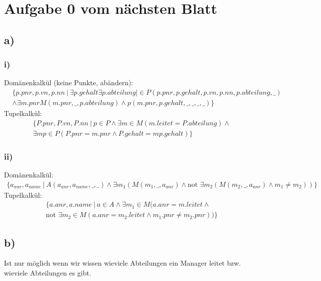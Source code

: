 \section*{Aufgabe 0 vom nächsten Blatt}
\subsection*{a)}
\subsubsection*{i)}
Domänenkalkül (keine Punkte, abändern):
\begin{align*}
&\{p.pnr,p.vn,p.nn\ |\ \exists p.gehalt \exists p.abteilung | \in P(p.pnr,p.gehalt,p.vn,p.nn,p.abteilung,\_)\\
&\land \exists m.pnr M(m.pnr,\_,p.abteilung)\land p(m.pnr,p.gehalt,\_,\_,\_,\_)\}
\end{align*}
Tupelkalkül:
\begin{align*}
  &\{P.pnr,P.vn,P.nn\ |\ p\in P\land \exists m\in M(m.leitet = P.abteilung)\land\\ 
  &\exists mp\in P(P.pnr = m.pnr \land P.gehalt = mp.gehalt)\}
\end{align*}
\subsubsection*{ii)}
Domänenkalkül:
\begin{align*}
  \{a_{anr},a_{name}\ |\ A(a_{anr},a_{name},\_,\_)\land \exists m_1 (M(m_1,\_,a_{anr})\land \text{not }\exists m_2(M(m_2,\_,a_{anr})\land m_1 \not = m_2))  \}
\end{align*}
Tupelkalkül:
\begin{align*}
&\{a.anr,a.name\ |\ a\in A \land \exists m_1 \in M(a.anr = m.leitet \land\\
&\text{not }\exists m_2 \in M(a.anr = m_2.leitet \land m_1.pnr \not = m_2.pnr))\}
\end{align*}
\subsection*{b)}
Ist nur möglich wenn wir wissen wieviele Abteilungen ein Manager leitet bzw. wieviele Abteilungen es gibt.